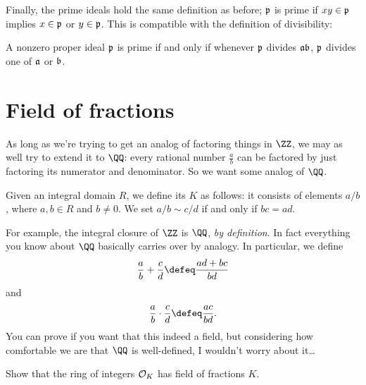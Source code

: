 Finally, the prime ideals hold the same definition as before;
$\pp$ is prime if $xy \in \pp$ implies $x \in \pp$ or $y \in \pp$.
This is compatible with the definition of divisibility:
\begin{exercise}
	A nonzero proper ideal $\pp$ is prime
	if and only if whenever $\pp$ divides $\aa \bb$,
	$\pp$ divides one of $\aa$ or $\bb$.
\end{exercise}


\section{Field of fractions}
As long as we're trying to get an analog of factoring things in $\ZZ$,
we may as well try to extend it to $\QQ$: every rational number $\frac ab$ can be
factored by just factoring its numerator and denominator.
So we want some analog of $\QQ$.

Given an integral domain $R$, we define its  $K$ as follows:
it consists of elements $a / b$, where $a,b \in R$ and $b \neq 0$.
We set $a / b \sim c / d$ if and only if $bc = ad$.

For example, the integral closure of $\ZZ$ is $\QQ$, \emph{by definition}.
In fact everything you know about $\QQ$ basically carries over by analogy.
In particular, we define
\[ \frac ab + \frac cd \defeq \frac{ad+bc}{bd} \]
and
\[ \frac ab \cdot \frac cd \defeq \frac{ac}{bd}. \]
You can prove if you want that this indeed a field, but 
considering how comfortable we are that $\QQ$ is well-defined,
I wouldn't worry about it\dots

\begin{ques}
	Show that the ring of integers $\OO_K$ has field of fractions $K$.
\end{ques}

